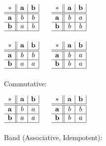 $\begin{array}{c||c|c|}
  * & \mathbf{a} & \mathbf{b} \\ \hline \hline
  \mathbf{a} & b & b \\ \hline
  \mathbf{b} & a & b \\ \hline
\end{array}$ $\quad$ $\begin{array}{c||c|c|}
  * & \mathbf{a} & \mathbf{b} \\ \hline \hline
  \mathbf{a} & b & a \\ \hline
  \mathbf{b} & b & b \\ \hline
\end{array}$ \\ \hfill \\

$\begin{array}{c||c|c|}
  * & \mathbf{a} & \mathbf{b} \\ \hline \hline
  \mathbf{a} & b & b \\ \hline
  \mathbf{b} & a & a \\ \hline
\end{array}$ $\quad$ $\begin{array}{c||c|c|}
  * & \mathbf{a} & \mathbf{b} \\ \hline \hline
  \mathbf{a} & b & a \\ \hline
  \mathbf{b} & b & a \\ \hline
\end{array}$
\\ \\
Commutative:

$\begin{array}{c||c|c|}
  * & \mathbf{a} & \mathbf{b} \\ \hline \hline
  \mathbf{a} & b & a \\ \hline
  \mathbf{b} & a & a \\ \hline
\end{array}$ $\quad$ $\begin{array}{c||c|c|}
  * & \mathbf{a} & \mathbf{b} \\ \hline \hline
  \mathbf{a} & b & b \\ \hline
  \mathbf{b} & b & a \\ \hline
\end{array}$
\\ \\
Band (Associative, Idempotent):

